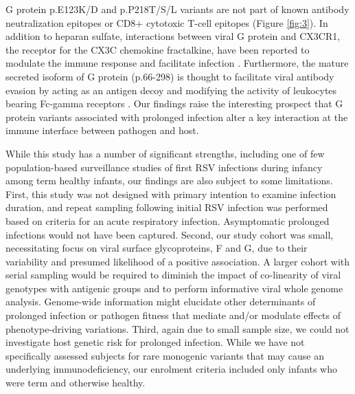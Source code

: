 \documentclass{article} %
\begin{document}
G protein p.E123K/D and p.P218T/S/L variants are not part of known antibody neutralization epitopes or CD8+ cytotoxic T-cell epitopes (Figure \ref{fig:3}). In addition to heparan sulfate, interactions between viral G protein and CX3CR1, the receptor for the CX3C chemokine fractalkine, have been reported to modulate the immune response and facilitate infection
\citep{levine1987demonstration, feldman1999identification, feldman2000fusion, johnson2015respiratory, tripp2001cx3c, jeong2015cx3cr1}.
Furthermore, the mature secreted isoform of G protein (p.66-298) is thought to facilitate viral antibody evasion by acting as an antigen decoy and modifying the activity of leukocytes bearing Fc-gamma receptors \citep{bukreyev2008secreted}. Our findings raise the interesting prospect that G protein variants associated with prolonged infection alter a key interaction at the immune interface between pathogen and host.

While this study has a number of significant strengths, including one of few population-based surveillance studies of first RSV infections during infancy among term healthy infants, our findings are also subject to some limitations. First, this study was not designed with primary intention to examine infection duration, and repeat sampling following initial RSV infection was performed based on criteria for an acute respiratory infection. Asymptomatic prolonged infections would not have been captured. Second, our study cohort was small, necessitating focus on viral surface glycoproteins, F and G, due to their variability and presumed likelihood of a positive association. A larger cohort with serial sampling would be required to diminish the impact of co-linearity of viral genotypes with antigenic groups and to perform informative viral whole genome analysis. Genome-wide information might elucidate other determinants of prolonged infection or pathogen fitness that mediate and/or modulate effects of phenotype-driving variations. Third, again due to small sample size, we could not investigate host genetic risk for prolonged infection. While we have not specifically assessed subjects for rare monogenic variants that may cause an underlying immunodeficiency, our enrolment criteria included only infants who were term and otherwise healthy. 
\end{document}
